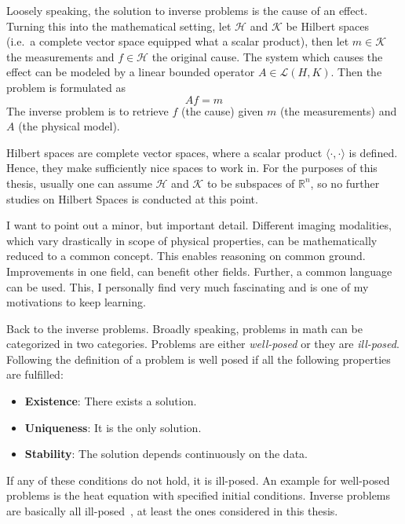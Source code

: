 \begin{definition}\label{def:inverse_problem}
	Loosely speaking, the solution to inverse problems is the cause of an effect. Turning this
	into the mathematical setting, let \(\mathcal{H}\) and \(\mathcal{K}\) be Hilbert spaces
	(i.e.\ a complete vector space equipped what a scalar product), then let \(m \in
	\mathcal{K}\) the measurements and \(f \in \mathcal{H}\) the original cause. The system
	which causes the effect can be modeled by a linear bounded operator \(A \in \mathscr{L}(H,
	K)\). Then the problem is formulated as
	\[ A f = m \]
	The inverse problem is to retrieve \(f\) (the cause) given \(m\) (the measurements) and \(A\)
	(the physical model).
\end{definition}

Hilbert spaces are complete vector spaces, where a scalar product \(\langle\cdot,\cdot\rangle\) is
defined. Hence, they make sufficiently nice spaces to work in. For the purposes of this thesis,
usually one can assume \(\mathcal{H}\) and \(\mathcal{K}\) to be subspaces of \(\mathbb{R}^n\), so
no further studies on Hilbert Spaces is conducted at this point.

I want to point out a minor, but important detail. Different imaging modalities, which vary
drastically in scope of physical properties, can be mathematically reduced to a common concept. This
enables reasoning on common ground. Improvements in one field, can benefit other fields. Further, a
common language can be used. This, I personally find very much fascinating and is one of my
motivations to keep learning.

Back to the inverse problems. Broadly speaking, problems in math can be categorized in two
categories. Problems are either \textit{well-posed} or they are \textit{ill-posed}. Following the
definition of \textcite{hadamard_sur_1902} a problem is well posed if all the following
properties are fulfilled:

\begin{itemize}
	\item \textbf{Existence}: There exists a solution.
	\item \textbf{Uniqueness}: It is the only solution.
	\item \textbf{Stability}: The solution depends continuously on the data.
\end{itemize}

If any of these conditions do not hold, it is ill-posed. An example for well-posed problems is the
heat equation with specified initial conditions. Inverse problems are basically all
ill-posed~\cite{hansen_discrete_2010}, at least the ones considered in this thesis.

